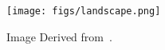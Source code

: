 




\begin{refsection}
\begin{frame}{}
  \begin{figure}
    \centering
    \texttt{[image: figs/landscape.png]}
    \caption{\scriptsize Image Derived from~\parencite{CVPR2023Tutorial}.}
  \end{figure}
  \bottomleftrefs
\end{frame}
\end{refsection}


